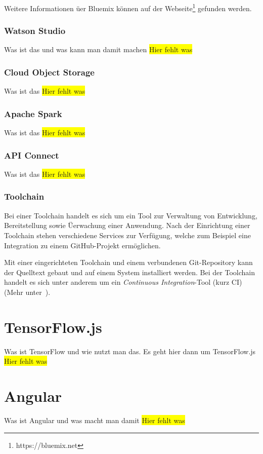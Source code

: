Weitere Informationen üer Bluemix können auf der Webseite\footnote{https://bluemix.net} gefunden werden.

\subsubsection{Watson Studio}
Was ist das und was kann man damit machen
\colorbox{yellow}{Hier fehlt was}

\subsubsection{Cloud Object Storage}
Was ist das
\colorbox{yellow}{Hier fehlt was}

\subsubsection{Apache Spark}
Was ist das
\colorbox{yellow}{Hier fehlt was}

\subsubsection{API Connect}
Was ist das
\colorbox{yellow}{Hier fehlt was}

\subsubsection{Toolchain}
Bei einer Toolchain handelt es sich um ein Tool zur Verwaltung von Entwicklung, Bereitstellung sowie Üerwachung einer
Anwendung. Nach der Einrichtung einer Toolchain stehen verschiedene Services zur Verfügung, welche zum Beispiel eine
Integration zu einem GitHub-Projekt ermöglichen.

Mit einer eingerichteten Toolchain und einem verbundenen Git-Repository kann der Quelltext gebaut und auf einem System
installiert werden. Bei der Toolchain handelt es sich unter anderem um ein \textit{Continuous Integration}-Tool (kurz CI)
(Mehr unter~\cite{online_grundlagen_toolchain}).

\section{TensorFlow.js}
Was ist TensorFlow und wie nutzt man das. Es geht hier dann um TensorFlow.js
\colorbox{yellow}{Hier fehlt was}

\section{Angular}
Was ist Angular und was macht man damit
\colorbox{yellow}{Hier fehlt was}

